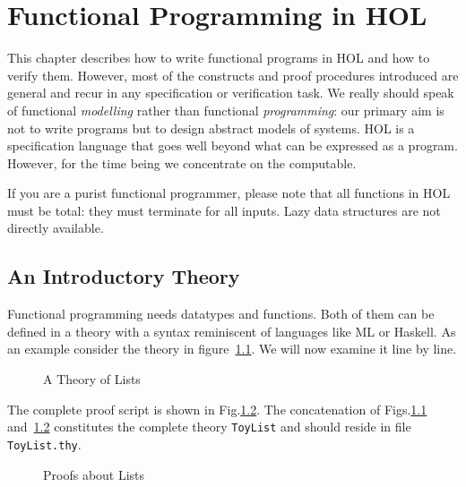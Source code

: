 \chapter{Functional Programming in HOL}

This chapter describes how to write
functional programs in HOL and how to verify them.  However, 
most of the constructs and
proof procedures introduced are general and recur in any specification
or verification task.  We really should speak of functional
\emph{modelling} rather than functional \emph{programming}: 
our primary aim is not
to write programs but to design abstract models of systems.  HOL is
a specification language that goes well beyond what can be expressed as a
program. However, for the time being we concentrate on the computable.

If you are a purist functional programmer, please note that all functions
in HOL must be total:
they must terminate for all inputs.  Lazy data structures are not
directly available.

\section{An Introductory Theory}
\label{sec:intro-theory}

Functional programming needs datatypes and functions. Both of them can be
defined in a theory with a syntax reminiscent of languages like ML or
Haskell. As an example consider the theory in figure~\ref{fig:ToyList}.
We will now examine it line by line.

\begin{figure}[htbp]
\begin{ttbox}\makeatother
\end{ttbox}
\caption{A Theory of Lists}
\label{fig:ToyList}
\end{figure}

{\makeatother}

The complete proof script is shown in Fig.\ts\ref{fig:ToyList-proofs}. The
concatenation of Figs.\ts\ref{fig:ToyList} and~\ref{fig:ToyList-proofs}
constitutes the complete theory \texttt{ToyList} and should reside in file
\texttt{ToyList.thy}.

\begin{figure}[htbp]
\begin{ttbox}\makeatother
\end{ttbox}
\caption{Proofs about Lists}
\label{fig:ToyList-proofs}
\end{figure}

